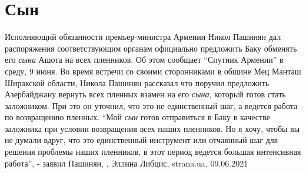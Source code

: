  
 
 
 
 
\chapter{Сын}

Исполняющий обязанности премьер-министра Армении Никол Пашинян дал распоряжения
соответствующим органам официально предложить Баку обменять его \emph{сына} Ашота на
всех пленников. Об этом сообщает \enquote{Спутник Армении} в среду, 9 июня. Во
время встречи со своими сторонниками в общине Мец Манташ Ширакской области,
Никола Пашинян рассказал что поручил предложить Азербайджану вернуть всех
пленных взамен на его \emph{сына}, который готов стать заложником. При это он уточнил,
что это не единственный шаг, а ведется работа по возвращению пленных.
\enquote{Мой \emph{сын} готов отправиться в Баку в качестве заложника при условии
возвращения всех наших пленников. Но я хочу, чтобы вы не думали вдруг, что это
единственный инструмент или отчаянный шаг для решения проблемы наших пленников,
в этот период ведется большая интенсивная работа}, - заявил Пашинян,
, Эллина Либцис, strana.ua, 09.06.2021

